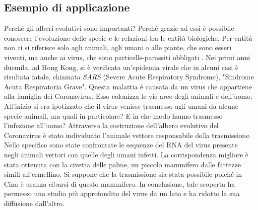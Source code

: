 \subsection*{Esempio di applicazione}
Perché gli alberi evolutivi sono importanti? Perché grazie ad essi è possibile conoscere l'evoluzione delle specie e le relazioni tra le entità biologiche. Per entità non ci si riferisce solo agli animali, agli umani o alle piante, che sono esseri viventi, ma anche ai virus, che sono particelle-parassiti obbligati \cite{campbellBiology}.
\newline
Nei primi anni duemila, ad Hong Kong, si è verificata un'epidemia virale che in alcuni casi è risultata fatale, chiamata \textit{SARS} (Severe Acute Respiratory Syndrome), "Sindrome Acuta Respiratoria Grave".
\newline
Questa malattia è causata da un virus che appartiene alla famiglia dei Coronavirus. Esso colonizza le vie aree degli animali e dell'uomo. All'inizio si era ipotizzato che il virus venisse trasmesso agli umani da alcune specie animali, ma quali in particolare? E in che modo hanno trasmesso l'infezione all'uomo?
\newline
Attraverso la costruzione dell'albero evolutivo del Coronavirus è stato individuato l'animale vettore responsabile della trasmissione. Nello specifico sono state confrontate le sequenze del RNA del virus presente negli animali vettori con quelle degli umani infetti. La corrispondenza migliore è stata ottenuta con la civetta delle palme, un piccolo mammifero dalle fattezze simili all'ermellino. Si suppone che la trasmissione sia stata possibile poiché in Cina è usanza cibarsi di questo mammifero.
\newline
In conclusione, tale scoperta ha permesso uno studio più approfondito del virus da un lato e ha ridotto la sua diffusione dall'altro.


